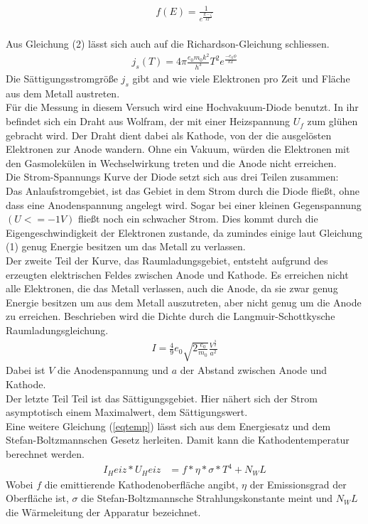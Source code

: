 \begin{align}
f(E)=\frac{1}{e^\frac{E-\zeta}{kT}}
\end{align}
\\
Aus Gleichung (2) lässt sich auch auf die Richardson-Gleichung schliessen.
\begin{align}
j_s(T)=4\pi\frac{e_0 m_0 k^2}{h^3}T^2e^\frac{-e_0\phi}{kT}
\end{align}
Die Sättigungsstromgröße $j_s$ gibt and wie viele Elektronen pro Zeit und Fläche aus dem Metall austreten.
\\
Für die Messung in diesem Versuch wird eine Hochvakuum-Diode benutzt. In ihr befindet sich ein Draht aus Wolfram, der mit einer Heizspannung $U_f$ zum glühen gebracht wird. Der Draht dient dabei als Kathode, von der die ausgelösten Elektronen zur Anode wandern. Ohne ein Vakuum, würden die Elektronen mit den Gasmolekülen in Wechselwirkung treten und die Anode nicht erreichen.
\\
Die Strom-Spannungs Kurve der Diode setzt sich aus drei Teilen zusammen:
\\
Das Anlaufstromgebiet, ist das Gebiet in dem Strom durch die Diode fließt, ohne dass eine Anodenspannung angelegt wird. Sogar bei einer kleinen Gegenspannung $(U<=-1V)$ fließt noch ein schwacher Strom. Dies kommt durch die Eigengeschwindigkeit der Elektronen zustande, da zumindes einige laut Gleichung (1) genug Energie besitzen um das Metall zu verlassen.
\\
Der zweite Teil der Kurve, das Raumladungsgebiet, entsteht aufgrund des erzeugten elektrischen Feldes zwischen Anode und Kathode. Es erreichen nicht alle Elektronen, die das Metall verlassen, auch die Anode, da sie zwar genug Energie besitzen  um aus dem Metall auszutreten, aber nicht genug um die Anode zu erreichen.
Beschrieben wird die Dichte durch die Langmuir-Schottkysche Raumladungsgleichung.
\begin{align}
I=\frac49e_0\sqrt{2\frac{e_0}{m_0}}\frac{V^\frac32}{a^2} \label{eqlangmuir}
\end{align}
Dabei ist $V$ die Anodenspannung und $a$ der Abstand zwischen Anode und Kathode.
\\
Der letzte Teil Teil ist das Sättigungsgebiet. Hier nähert sich der Strom asymptotisch einem Maximalwert, dem Sättigungswert. \\

Eine weitere Gleichung (\ref{eqtemp}) lässt sich aus dem Energiesatz und dem Stefan-Boltzmannschen Gesetz \cite{anleitung}
herleiten. Damit kann die Kathodentemperatur berechnet werden.
\begin{align}
I_Heiz*U_Heiz&=f*\eta*\sigma*T^4+N_WL \label{eqtemp}
\end{align}
Wobei $f$ die emittierende Kathodenoberfläche angibt, $\eta$ der Emissionsgrad der Oberfläche ist, $\sigma$ 
die Stefan-Boltzmannsche Strahlungskonstante meint und $N_WL$ die Wärmeleitung der Apparatur bezeichnet.




